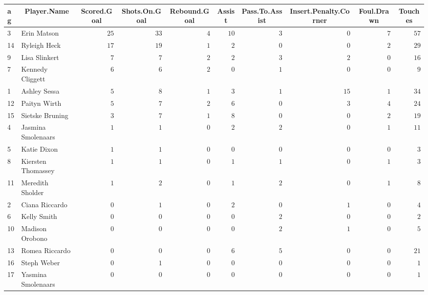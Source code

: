\begin{table}[!tbp]
\begin{center}
\begin{tabular}{llrrrrrrrr}
\hline\hline
\multicolumn{1}{l}{ag}&\multicolumn{1}{c}{Player.Name}&\multicolumn{1}{c}{Scored.Goal}&\multicolumn{1}{c}{Shots.On.Goal}&\multicolumn{1}{c}{Rebound.Goal}&\multicolumn{1}{c}{Assist}&\multicolumn{1}{c}{Pass.To.Assist}&\multicolumn{1}{c}{Insert.Penalty.Corner}&\multicolumn{1}{c}{Foul.Drawn}&\multicolumn{1}{c}{Touches}\tabularnewline
\hline
3&Erin Matson&$25$&$33$&$4$&$10$&$3$&$ 0$&$7$&$57$\tabularnewline
14&Ryleigh Heck&$17$&$19$&$1$&$ 2$&$0$&$ 0$&$2$&$29$\tabularnewline
9&Lisa Slinkert&$ 7$&$ 7$&$2$&$ 2$&$3$&$ 2$&$0$&$16$\tabularnewline
7&Kennedy Cliggett&$ 6$&$ 6$&$2$&$ 0$&$1$&$ 0$&$0$&$ 9$\tabularnewline
1&Ashley Sessa&$ 5$&$ 8$&$1$&$ 3$&$1$&$15$&$1$&$34$\tabularnewline
12&Paityn Wirth&$ 5$&$ 7$&$2$&$ 6$&$0$&$ 3$&$4$&$24$\tabularnewline
15&Sietske Bruning&$ 3$&$ 7$&$1$&$ 8$&$0$&$ 0$&$2$&$19$\tabularnewline
4&Jasmina Smolenaars&$ 1$&$ 1$&$0$&$ 2$&$2$&$ 0$&$1$&$11$\tabularnewline
5&Katie Dixon&$ 1$&$ 1$&$0$&$ 0$&$0$&$ 0$&$0$&$ 3$\tabularnewline
8&Kiersten Thomassey&$ 1$&$ 1$&$0$&$ 1$&$1$&$ 0$&$1$&$ 3$\tabularnewline
11&Meredith Sholder&$ 1$&$ 2$&$0$&$ 1$&$2$&$ 0$&$1$&$ 8$\tabularnewline
2&Ciana Riccardo&$ 0$&$ 1$&$0$&$ 2$&$0$&$ 1$&$0$&$ 4$\tabularnewline
6&Kelly Smith&$ 0$&$ 0$&$0$&$ 0$&$2$&$ 0$&$0$&$ 2$\tabularnewline
10&Madison Orobono&$ 0$&$ 0$&$0$&$ 0$&$2$&$ 1$&$0$&$ 5$\tabularnewline
13&Romea Riccardo&$ 0$&$ 0$&$0$&$ 6$&$5$&$ 0$&$0$&$21$\tabularnewline
16&Steph Weber&$ 0$&$ 1$&$0$&$ 0$&$0$&$ 0$&$0$&$ 1$\tabularnewline
17&Yasmina Smolenaars&$ 0$&$ 0$&$0$&$ 0$&$0$&$ 0$&$0$&$ 1$\tabularnewline
\hline
\end{tabular}\end{center}
\end{table}
